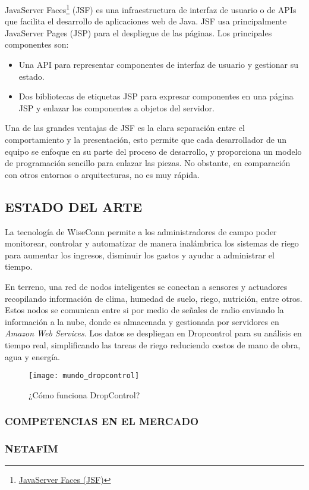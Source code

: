 
JavaServer Faces\footnote{\href{https://www.juntadeandalucia.es/servicios/madeja/contenido/recurso/101}{JavaServer Faces (JSF)}} (JSF) es una infraestructura de interfaz de usuario o de APIs que facilita el desarrollo de aplicaciones web de Java. JSF usa principalmente JavaServer Pages (JSP) para el despliegue de las páginas. Los principales componentes son:
\begin{itemize}
    \item Una API para representar componentes de interfaz de usuario y gestionar su estado.
    \item Dos bibliotecas de etiquetas JSP para expresar componentes en una página JSP y enlazar los componentes a objetos del servidor.
\end{itemize}
Una de las grandes ventajas de JSF es la clara separación entre el comportamiento y la presentación, esto permite que cada desarrollador de un equipo se enfoque en su parte del proceso de desarrollo, y proporciona un modelo de programación sencillo para enlazar las piezas. No obstante, en comparación con otros entornos o arquitecturas, no es muy rápida.

\subsection{ESTADO DEL ARTE}
La tecnología de WiseConn permite a los administradores de campo poder monitorear, controlar y automatizar de manera inalámbrica los sistemas de riego para aumentar los ingresos, disminuir los gastos y ayudar a administrar el tiempo.

En terreno, una red de nodos inteligentes se conectan a sensores y actuadores recopilando información de clima, humedad de suelo, riego, nutrición, entre otros. Estos nodos se comunican entre si por medio de señales de radio enviando la información a la nube, donde es almacenada y gestionada por servidores en \textit{Amazon Web Services}. Los datos se despliegan en Dropcontrol para su análisis en tiempo real, simplificando las tareas de riego reduciendo costos de mano de obra, agua y energía.
\begin{figure}[h]
	\centering
	\texttt{[image: mundo\_dropcontrol]}
	\caption{\label{fig:mundrop} ¿Cómo funciona DropControl?}
\end{figure}

\subsubsection{COMPETENCIAS EN EL MERCADO}

\subsubsection{NETAFIM}

